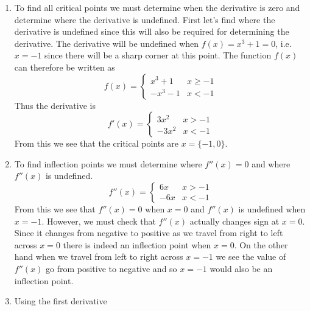 \documentclass{hwset}
\begin{document}
\begin{enumerate}
	\item \begin{solution}
		To find all critical points we must determine when the derivative is zero
		and determine where the derivative is undefined. First let's find where the
		derivative is undefined since this will also be required for determining the
		derivative. The derivative will be undefined when $f(x)=x^3+1=0$, i.e.
		$x=-1$ since there will be a sharp corner at this point. The function $f(x)$
		can therefore be written as
		\begin{equation*}
			f(x) = \begin{cases}
				x^3+1 & x \ge -1\\
				-x^3 - 1 &  x < -1
		\end{cases}
		\end{equation*}
		Thus the derivative is 
		\begin{equation*}
			f'(x) = \begin{cases}
				3x^2 & x > -1\\
				-3x^2 & x < -1
			\end{cases}
		\end{equation*}
		From this we see that the critical points are $x=\{-1,0\}$.
	\end{solution}
	\item \begin{solution}
		To find inflection points we must determine where $f''(x) = 0$ and where
    $f''(x)$ is undefined.
		\begin{equation*}
			f''(x) = \begin{cases}
				6x & x > -1\\
				-6x & x < -1
			\end{cases}
		\end{equation*}
		From this we see that $f''(x) = 0$ when $x=0$ and $f''(x)$ is undefined when
    $x=-1$. However, we must check that $f''(x)$ actually changes sign at $x=0$.
    Since it changes from negative to positive as we travel from right to left
    across $x=0$ there is indeed an inflection point when $x=0$. On the other
    hand when we travel from left to right across $x=-1$ we see the value of
    $f''(x)$ go from positive to negative and so $x=-1$ would also be an
    inflection point.
  \end{solution}
	\item \begin{solution}
		Using the first derivative
	\begin{center}

\end{center}
\end{solution}
\end{enumerate}
\end{document}
